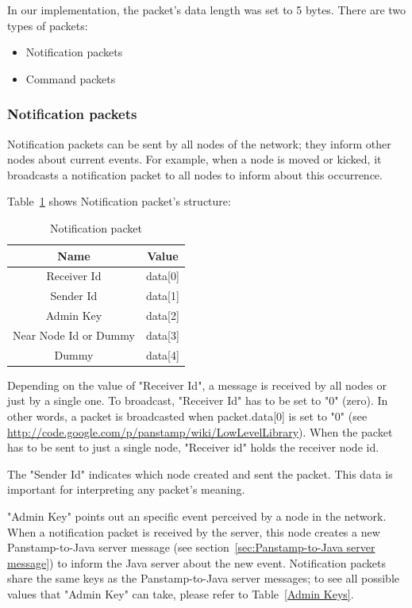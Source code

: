 In our implementation, the packet's data length was set to 5 bytes. There are two types of packets:
\begin{itemize}
\item Notification packets
\item Command packets
\end{itemize}

\subsubsection{Notification packets}
\label{sec:Notification packet}
Notification packets can be sent by all nodes of the network; they inform other nodes about current events. 
For example, when a node is moved or kicked, it broadcasts a notification packet to all nodes to inform about this occurrence. 

Table~\ref{Notification-packet} shows Notification packet's structure:

\begin{table}[h]
  \centering
  \begin{tabular}{ c | c }
    \hline
    \textbf{Name} & \textbf{Value}\\ [0.5ex]    
    \hline
    Receiver Id & data[0] \\
    Sender Id & data[1] \\
    Admin Key & data[2]\\
    Near Node Id or Dummy & data[3]\\
    Dummy & data[4]\\      
    \hline
  \end{tabular}
  \caption[Notification packet]%
          {Notification packet}
  \label{Notification-packet}
\end{table}

Depending on the value of "Receiver Id", a message is received by all nodes or just by a single one. To broadcast, "Receiver Id" has to be set to "0" (zero). In other words, a packet is broadcasted when packet.data[0] is set to "0" (see \url{http://code.google.com/p/panstamp/wiki/LowLevelLibrary}).
When the packet has to be sent to just a single node, "Receiver id" holds the receiver node id.

The "Sender Id" indicates which node created and sent the packet. This data is important for interpreting any packet's meaning.

"Admin Key" points out an specific event perceived by a node in the network. When a notification packet is received by the server, this node creates a new Panstamp-to-Java server message (see section~\ref{sec:Panstamp-to-Java server message}) to inform the Java server about the new event. Notification packets share the same keys as the Panstamp-to-Java server messages; to see all possible values that "Admin Key" can take, please refer to Table~\ref{Admin Keys}. 

